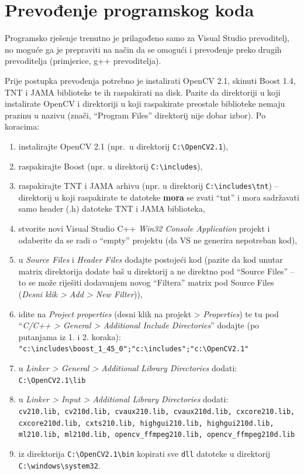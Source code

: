 \documentclass[lmodern, utf8, seminar, numeric]{fer}
\begin{document}
\section{Prevođenje programskog koda}
Programsko rješenje trenutno je prilagođeno samo za Visual Studio prevoditelj,
no moguće ga je prepraviti na način da se omogući i prevođenje preko drugih
prevoditelja (primjerice, g++ prevoditelja).

Prije postupka prevođenja potrebno je instalirati OpenCV 2.1, skinuti Boost 1.4,
TNT i JAMA biblioteke te ih raspakirati na disk. Pazite da direktoriji u koji
instalirate OpenCV i direktoriji u koji raspakirate preostale biblioteke nemaju
prazinu u nazivu (znači, ``Program Files'' direktorij nije dobar izbor). Po
koracima:
\begin{enumerate}
  \item instalirajte OpenCV 2.1 (npr.\ u direktorij \verb|C:\OpenCV2.1|),
  \item raspakirajte Boost (npr. u direktorij \verb|C:\includes|),
  \item raspakirajte TNT i JAMA arhivu (npr. u direktorij
  \verb|C:\includes\tnt|) -- direktorij u koji raspakirate te datoteke \textbf{mora} se
  zvati ``tnt'' i mora sadržavati samo header (.h) datoteke TNT i JAMA
  biblioteka,
  \item stvorite novi Visual Studio C++ \emph{Win32 Console Application} projekt i
  odaberite da se radi o ``empty'' projektu (da VS ne generira nepotreban kod),
  \item u \emph{Source Files} i \emph{Header Files} dodajte postojeći kod (pazite da kod
  unutar matrix direktorija dodate baš u direktorij a ne direktno pod ``Source
  Files'' -- to se može riješiti dodavanjem novog ``Filtera'' matrix pod Source
  Files (\emph{Desni klik > Add > New Filter})),
  \item idite na \emph{Project properties} (desni klik na projekt > \emph{Properties}) te tu
  pod ``\emph{C/C++ > General > Additional Include Directories}'' dodajte (po putanjama
  iz 1. i 2. koraka):\\
\verb|"c:\includes\boost_1_45_0";"c:\includes";"c:\OpenCV2.1"|
  \item u \emph{Linker > General > Additional Library Directories} dodati:\\
  \verb|C:\OpenCV2.1\lib|
  \item u \emph{Linker > Input > Additional Library Directories} dodati:\\
\texttt{cv210.lib, cv210d.lib, cvaux210.lib, cvaux210d.lib, cxcore210.\-lib,
cxcore210d.lib, cxts210.lib, highgui210.lib, highgui210d.\-lib, ml210.lib,
ml210d.lib, opencv\_ffmpeg210.lib, opencv\_ffmpeg\-210d.lib}
  \item iz direktorija \verb|C:\OpenCV2.1\bin| kopirati sve \texttt{dll} datoteke u
  direktorij\\
  \verb|C:\windows\system32|.
\end{enumerate}
\end{document}
